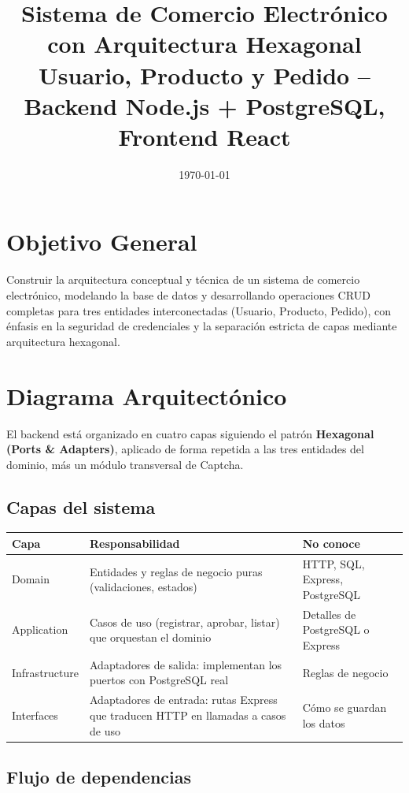 \documentclass[11pt,a4paper]{article}
\title{Sistema de Comercio Electrónico con Arquitectura Hexagonal \\ \large Usuario, Producto y Pedido -- Backend Node.js + PostgreSQL, Frontend React}
\author{}
\date{\today}
\begin{document}
 
\maketitle
\tableofcontents
\newpage
 
\section{Objetivo General}
 
Construir la arquitectura conceptual y técnica de un sistema de comercio electrónico, modelando la base de datos y desarrollando operaciones CRUD completas para tres entidades interconectadas (Usuario, Producto, Pedido), con énfasis en la seguridad de credenciales y la separación estricta de capas mediante arquitectura hexagonal.
 
\section{Diagrama Arquitectónico}
 
El backend está organizado en cuatro capas siguiendo el patrón \textbf{Hexagonal (Ports \& Adapters)}, aplicado de forma repetida a las tres entidades del dominio, más un módulo transversal de Captcha.
 
\subsection{Capas del sistema}
 
\begin{longtable}{p{3cm}p{6cm}p{5cm}}
\toprule
\textbf{Capa} & \textbf{Responsabilidad} & \textbf{No conoce} \\
\midrule
\endhead
Domain & Entidades y reglas de negocio puras (validaciones, estados) & HTTP, SQL, Express, PostgreSQL \\
Application & Casos de uso (registrar, aprobar, listar) que orquestan el dominio & Detalles de PostgreSQL o Express \\
Infrastructure & Adaptadores de salida: implementan los puertos con PostgreSQL real & Reglas de negocio \\
Interfaces & Adaptadores de entrada: rutas Express que traducen HTTP en llamadas a casos de uso & Cómo se guardan los datos \\
\bottomrule
\end{longtable}
 
\subsection{Flujo de dependencias}
 
\end{document}
